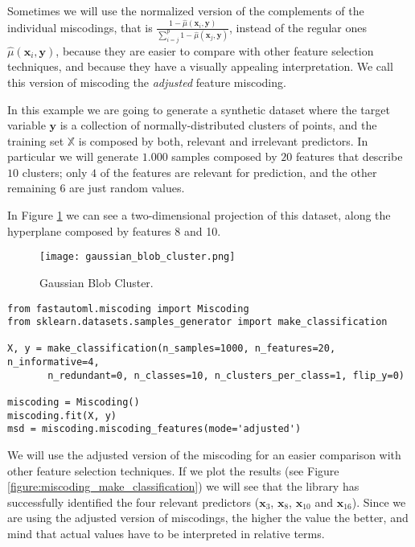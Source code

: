 Sometimes we will use the normalized version of the complements of the individual miscodings, that is $\frac{ 1 - \hat\mu(\mathbf{x}_i, \mathbf{y}) } { \sum_{i=j}^p 1 - \hat\mu(\mathbf{x}_j, \mathbf{y}) }$, instead of the regular ones $\hat\mu(\mathbf{x}_i, \mathbf{y})$, because they are easier to compare with other feature selection techniques, and because they have a visually appealing interpretation. We call this version of miscoding the \emph{adjusted} feature miscoding.

\begin{example}
\label{example:gaussian_blob_miscoding}
In this example we are going to generate a synthetic dataset where the target variable $\mathbf{y}$ is a collection of normally-distributed clusters of points, and the training set $\mathbb{X}$ is composed by both, relevant and irrelevant predictors. In particular we will generate $1.000$ samples composed by $20$ features that describe $10$ clusters; only $4$ of the features are relevant for prediction, and the other remaining $6$ are just random values.

In Figure \ref{figure:gaussian_blob_cluster} we can see a two-dimensional projection of this dataset, along the hyperplane composed by features 8 and 10.

\begin{figure}[h]
\centering
\texttt{[image: gaussian\_blob\_cluster.png]}
\caption{Gaussian Blob Cluster.}
\label{figure:gaussian_blob_cluster}
\end{figure}

\begin{sourcecode}
{\scriptsize \begin{verbatim}
from fastautoml.miscoding import Miscoding
from sklearn.datasets.samples_generator import make_classification

X, y = make_classification(n_samples=1000, n_features=20, n_informative=4,
       n_redundant=0, n_classes=10, n_clusters_per_class=1, flip_y=0)

miscoding = Miscoding()
miscoding.fit(X, y)
msd = miscoding.miscoding_features(mode='adjusted')
\end{verbatim}}
\end{sourcecode}

We will use the adjusted version of the miscoding for an easier comparison with other feature selection techniques. If we plot the results (see Figure \ref{figure:miscoding_make_classification}) we will see that the library has successfully identified the four relevant predictors ($\mathbf{x}_3$, $\mathbf{x}_8$, $\mathbf{x}_{10}$ and $\mathbf{x}_{16}$). Since we are using the adjusted version of miscodings, the higher the value the better, and mind that actual values have to be interpreted in relative terms. 


\end{example}
